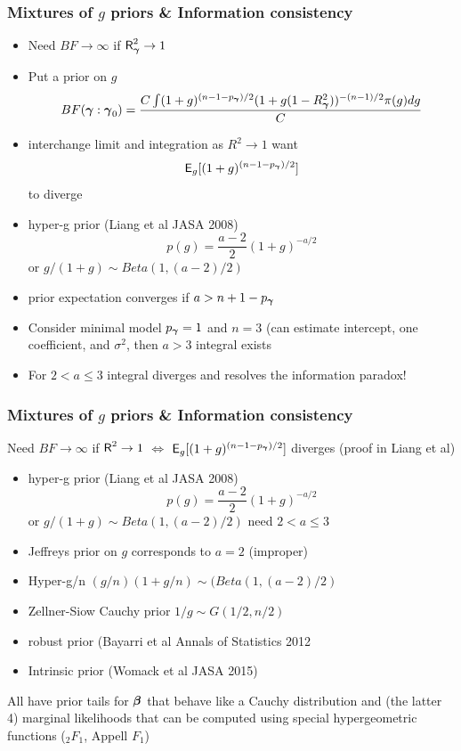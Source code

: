 \documentclass[]{beamer}\usepackage[]{graphicx}\usepackage[]{color}
\begin{document}
\begin{frame}
  \frametitle{Mixtures of $g$ priors \& Information consistency}


\begin{itemize}
\item Need $BF \to \infty$ if $\textsf{R}_{\boldsymbol{\gamma}}^2 \to 1$
\item Put a prior on $g$
$$BF(\boldsymbol{\gamma} : \boldsymbol{\gamma}_0) =  \frac{ C \int (1 + g)^{(n - 1 - p_{\boldsymbol{\gamma}})/2} (1 + g(1 - R_{\boldsymbol{\gamma}}^2))^{-(n-1)/2} \pi(g) dg}{C}$$
\item interchange limit and integration as $R^2 \to 1$
want
$$ \textsf{E}_g[(1 +
g)^{(n-1-p_{\boldsymbol{\gamma}})/2}]$$  to diverge

\item hyper-g prior (Liang et al JASA 2008)
$$p(g) = \frac{a-2}{2}(1 + g)^{-a/2}$$ or $g/(1+g) \sim Beta(1, (a-2)/2)$

\item prior expectation converges if $a > n + 1 - p_{\boldsymbol{\gamma}}$

\item Consider minimal model $p_{\boldsymbol{\gamma}} = 1$ and $n = 3$ (can estimate intercept, one coefficient, and  $\sigma^2$, then $a > 3$ integral exists

\item For $2 < a \le 3$ integral diverges and resolves the information paradox!
\end{itemize}

\end{frame}

\begin{frame}
  \frametitle{Mixtures of $g$ priors \& Information consistency}

Need $BF \to \infty$ if $\textsf{R}^2 \to 1$  $\Leftrightarrow$ $\textsf{E}_g[(1 +
g)^{(n-1-p_{\boldsymbol{\gamma}})/2}]$ diverges  (proof in Liang et al)
\pause
\begin{itemize}

\item hyper-g prior (Liang et al JASA 2008)
$$p(g) = \frac{a-2}{2}(1 + g)^{-a/2}$$ or $g/(1+g) \sim Beta(1, (a-2)/2)$
need $2 < a \le 3$
\pause
\item Jeffreys prior on $g$ corresponds to $a = 2$ (improper) \pause
\item Hyper-g/n  $(g/n)(1 + g/n) \sim (Beta(1, (a-2)/2)$ \pause
\item Zellner-Siow Cauchy prior $1/g \sim G(1/2, n/2)$ \pause
\item robust prior (Bayarri et al Annals of Statistics 2012 \pause
\item Intrinsic prior (Womack et al  JASA 2015)
\end{itemize}

 All have prior tails for $\boldsymbol{\beta}$  that behave like a Cauchy distribution
 and (the latter 4) marginal  likelihoods that can be computed using special hypergeometric
 functions   ($_2F_1$, Appell $F_1$)
\end{frame}
\end{document}
